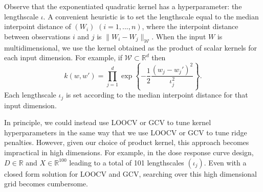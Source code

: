 Observe that the exponentiated quadratic kernel has a hyperparameter: the lengthscale $\iota$. A convenient heuristic is to set the lengthscale equal to the median interpoint distance of $(W_i)$ $(i=1,...,n)$, where the interpoint distance between observations $i$ and $j$ is $\|W_i-W_j\|_{\mathcal{W}}$. When the input $W$ is multidimensional, we use the kernel obtained as the product of scalar kernels for each input dimension. For example, if $\mathcal{W}\subset \mathbb{R}^d$ then
$$
k(w,w')=\prod_{j=1}^d \exp\left\{-\frac{1}{2}\frac{(w_j-w_j')^2}{\iota_j^2}\right\}.
$$
Each lengthscale $\iota_j$ is set according to the median interpoint distance for that input dimension.

In principle, we could instead use LOOCV or GCV to tune kernel hyperparameters in the same way that we use LOOCV or GCV to tune ridge penalties. However, given our choice of product kernel, this approach becomes impractical in high dimensions. For example, in the dose response curve design, $D\in\mathbb{R}$ and $X\in\mathbb{R}^{100}$ leading to a total of 101 lengthscales $(\iota_j)$. Even with a closed form solution for LOOCV and GCV, searching over this high dimensional grid becomes cumbersome.
